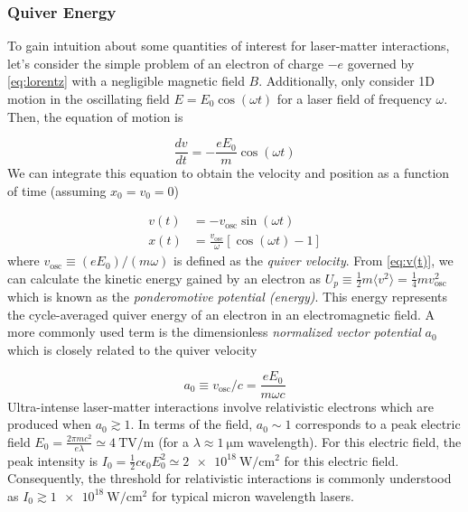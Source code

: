 \subsubsection{Quiver Energy}
To gain intuition about some quantities of interest for laser-matter interactions, let's consider the simple problem of an electron of charge $-e$ governed by \cref{eq:lorentz} with a negligible magnetic field $B$. Additionally, only consider 1D motion in the oscillating field $E = E_0 \cos(\omega t)$ for a laser field of frequency $\omega$. Then, the equation of motion is

\begin{equation}
	\frac{d v}{d t} = - \frac{e E_0}{m} \cos(\omega t)
\end{equation}
We can integrate this equation to obtain the velocity and position as a function of time (assuming $x_0 = v_0 = 0$)

\begin{align}
	v(t) &= - v_\text{osc} \sin(\omega t) \label{eq:v(t)} \\
	x(t) &= \frac{v_\text{osc}}{\omega} [\cos(\omega t) - 1] \label{eq:x(t)}
\end{align}
where $v_\text{osc} \equiv (e E_0) / (m \omega)$ is defined as the \emph{quiver velocity}. From \autoref{eq:v(t)}, we can calculate the kinetic energy gained by an electron as $U_p \equiv \frac{1}{2} m \langle v^2 \rangle = \frac{1}{4} m v_\text{osc}^2$ which is known as the \emph{ponderomotive potential (energy)}. This energy represents the cycle-averaged quiver energy of an electron in an electromagnetic field. A more commonly used term is the dimensionless \emph{normalized vector potential} $a_0$ which is closely related to the quiver velocity

\begin{equation}
	a_0 \equiv v_\text{osc} / c = \frac{e E_0}{m \omega c} \label{eq:a0}
\end{equation}
Ultra-intense laser-matter interactions involve relativistic electrons which are produced when $a_0 \gtrsim 1$. In terms of the field, $a_0 \sim 1$ corresponds to a peak electric field $E_0 = \frac{2 \pi m c^2}{e \lambda} \simeq \SI{4}{\tera \volt \per \meter}$ (for a $\lambda \approx \SI{1}{\micro \meter}$ wavelength). For this electric field, the peak intensity is $I_0 = \frac{1}{2} c \epsilon_0 E_0^2 \simeq \SI{2e18}{\watt \per \centi \meter \squared}$ for this electric field. Consequently, the threshold for relativistic interactions is commonly understood as $I_0 \gtrsim \SI{1e18}{\watt \per \centi \meter \squared}$ for typical micron wavelength lasers. 

